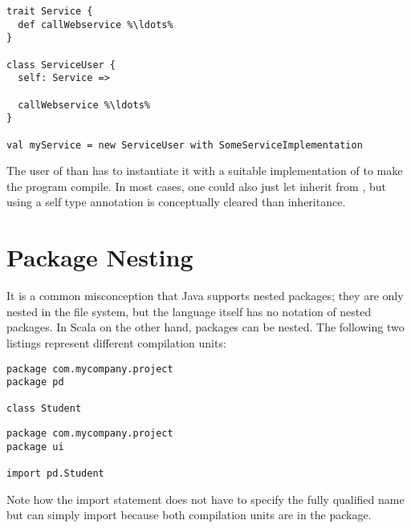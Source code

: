 \begin{lstlisting}
trait Service {
  def callWebservice %\ldots%
}

class ServiceUser {
  self: Service =>

  callWebservice %\ldots%
}

val myService = new ServiceUser with SomeServiceImplementation
\end{lstlisting}

The user of  than has to instantiate it with a suitable implementation of  to make the program compile. In most cases, one could also just let  inherit from , but using a self type annotation is conceptually cleared than inheritance.


\section{Package Nesting} \label{section:package-nesting}

It is a common misconception that Java supports nested packages; they are only nested in the file system, but the language itself has no notation of nested packages. In Scala on the other hand, packages can be nested. The following two listings represent different compilation units:

\begin{lstlisting}
package com.mycompany.project
package pd

class Student
\end{lstlisting}

\begin{lstlisting}
package com.mycompany.project
package ui

import pd.Student
\end{lstlisting}

Note how the import statement does not have to specify the fully qualified name but can simply import  because both compilation units are in the  package.

